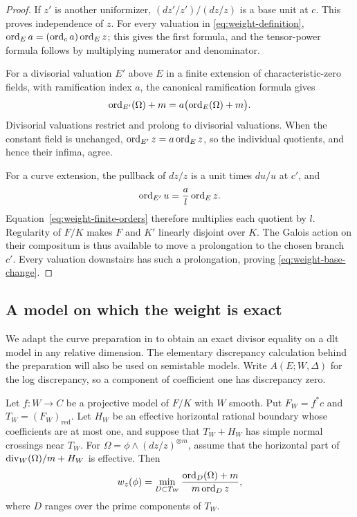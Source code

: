 \begin{proof}
If $z'$ is another uniformizer, $(dz'/z')/(dz/z)$ is a base unit at
$c$.  This proves independence of $z$.  For every valuation in
\eqref{eq:weight-definition},
$\operatorname{ord}_E a=(\operatorname{ord}_c a)\operatorname{ord}_E z$; this gives the first formula, and the
tensor-power formula follows by multiplying numerator and denominator.

For a divisorial valuation $E'$ above $E$ in a finite extension of
characteristic-zero fields, with ramification index $a$, the canonical
ramification formula gives
\begin{equation}\label{eq:weight-finite-orders}
                   \operatorname{ord}_{E'}(\Omega)+m
                      =a\bigl(\operatorname{ord}_E(\Omega)+m\bigr).
\end{equation}
Divisorial valuations restrict and prolong to divisorial valuations.
When the constant field is unchanged, $\operatorname{ord}_{E'}z=a\operatorname{ord}_E z$, so
the individual quotients, and hence their infima, agree.

For a curve extension, the pullback of $dz/z$ is a unit times $du/u$
at $c'$, and
\[
                         \operatorname{ord}_{E'}u=\frac{a}{l}\operatorname{ord}_E z.
\]
Equation~\eqref{eq:weight-finite-orders} therefore multiplies each
quotient by $l$.  Regularity of $F/K$ makes $F$ and $K'$ linearly
disjoint over $K$.  The Galois action on their compositum is thus
available to move a prolongation to the chosen branch $c'$.  Every
valuation downstairs has such a prolongation, proving
\eqref{eq:weight-base-change}.
\end{proof}

\subsection{A model on which the weight is exact}

We adapt the curve preparation in \cite[Section~4]{U4} to obtain an
exact divisor equality on a dlt model in any relative dimension.
The elementary discrepancy calculation behind the preparation will
also be used on semistable models.  Write $A(E;W,\Delta)$ for the log
discrepancy, so a component of coefficient one has discrepancy zero.

\begin{lemma}\label{lem:snc-weight}
Let $f:W\to C$ be a projective model of $F/K$ with $W$ smooth.  Put
$F_W=f^*c$ and $T_W=(F_W)_{\mathrm{red}}$.  Let $H_W$ be an effective
horizontal rational boundary whose coefficients are at most one, and
suppose that $T_W+H_W$ has simple normal crossings near $T_W$.
For $\Omega=\phi\wedge(dz/z)^{\otimes m}$, assume that the horizontal
part of $\operatorname{div}_W(\Omega)/m+H_W$ is effective.  Then
\begin{equation}\label{eq:weight-snc-minimum}
 w_z(\phi)=\min_{D\subset T_W}
                \frac{\operatorname{ord}_D(\Omega)+m}{m\operatorname{ord}_D z},
\end{equation}
where $D$ ranges over the prime components of $T_W$.
\end{lemma}

